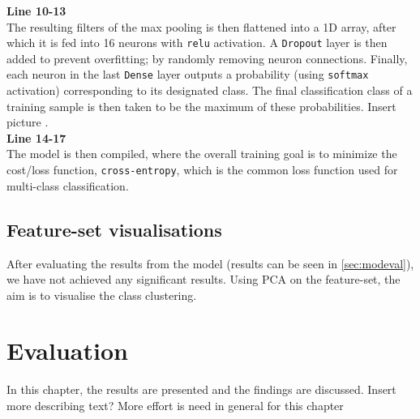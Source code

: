 \noindent \textbf{Line 10-13} \\
The resulting filters of the max pooling is then flattened into a 1D array, after which it is fed into 16 neurons with \verb|relu| activation. A \verb|Dropout| layer is then added to prevent overfitting; by randomly removing neuron connections. Finally, each neuron in the last \verb|Dense| layer outputs a probability (using \verb|softmax| activation) corresponding to its designated class. The final classification class of a training sample is then taken to be the maximum of these probabilities. Insert picture \todo{}.\\

\noindent \textbf{Line 14-17} \\
The model is then compiled, where the overall training goal is to minimize the cost/loss function, \verb|cross-entropy|, which is the common loss function used for multi-class classification.

\section{Feature-set visualisations}
After evaluating the results from the model (results can be seen in \ref{sec:modeval}), we have not achieved any significant results. Using PCA on the feature-set, the aim is to visualise the class clustering.\todo{}

\chapter{Evaluation}

In this chapter, the results are presented and the findings are discussed. Insert more describing text? More effort is need in general for this chapter\todo{}

